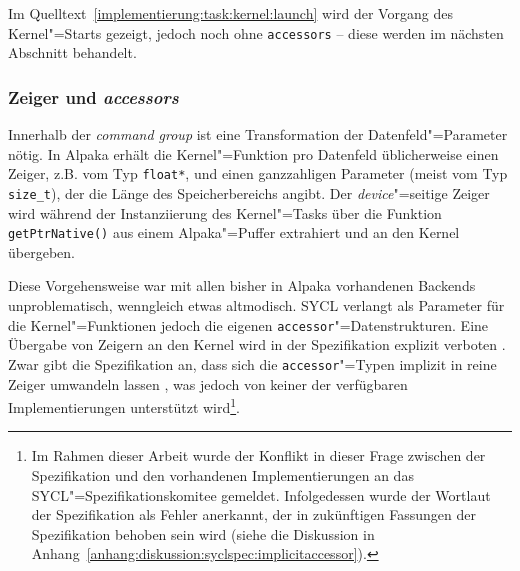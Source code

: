 Im Quelltext~\ref{implementierung:task:kernel:launch} wird der Vorgang des
Kernel"=Starts gezeigt, jedoch noch ohne \texttt{accessors} -- diese werden
im nächsten Abschnitt behandelt.

\subsubsection{Zeiger und \textit{accessors}}

Innerhalb der \textit{command group} ist eine Transformation der
Datenfeld"=Parameter nötig. In Alpaka erhält die Kernel"=Funktion pro Datenfeld
üblicherweise einen Zeiger, z.B. vom Typ \texttt{float*}, und einen ganzzahligen
Parameter (meist vom Typ \texttt{size\_t}), der die Länge des Speicherbereichs
angibt. Der \textit{device}"=seitige Zeiger wird während der Instanziierung des
Kernel"=Tasks über die Funktion \texttt{getPtrNative()} aus einem Alpaka"=Puffer
extrahiert und an den Kernel übergeben.

Diese Vorgehensweise war mit allen bisher in Alpaka vorhandenen Backends
unproblematisch, wenngleich etwas altmodisch. SYCL verlangt als Parameter für
die Kernel"=Funktionen jedoch die eigenen \texttt{accessor}"=Datenstrukturen.
Eine Übergabe von Zeigern an den Kernel wird in der Spezifikation explizit
verboten \cite[vgl.][192]{sycl2019}. Zwar gibt die Spezifikation an, dass sich
die \texttt{accessor}"=Typen implizit in reine Zeiger umwandeln lassen
\cite[vgl.][27]{sycl2019}, was jedoch von keiner der verfügbaren
Implementierungen unterstützt wird\footnote{Im Rahmen dieser Arbeit wurde der
Konflikt in dieser Frage zwischen der Spezifikation und den vorhandenen
Implementierungen an das SYCL"=Spezifikationskomitee gemeldet. Infolgedessen
wurde der Wortlaut der Spezifikation als Fehler anerkannt, der in zukünftigen
Fassungen der Spezifikation behoben sein wird (siehe die Diskussion in
Anhang~\ref{anhang:diskussion:syclspec:implicitaccessor}).}.

